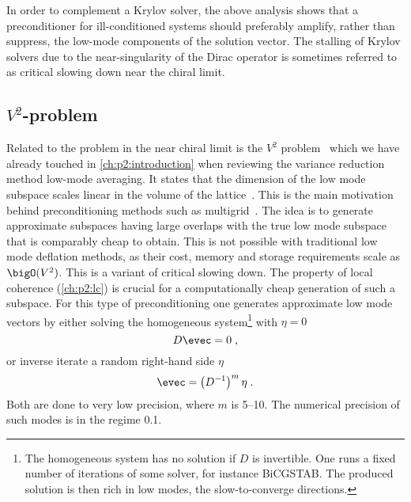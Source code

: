 
In order to complement a Krylov solver, the above analysis shows that a preconditioner for ill-conditioned systems should preferably amplify, rather than suppress, the low-mode components of the solution vector.
The stalling of Krylov solvers due to the near-singularity of the Dirac operator is sometimes referred to as critical slowing down near the chiral limit.

\subsection{\texorpdfstring{$V^{2}$}{V2}-problem}
\label{sec:mg:V2:problem}

Related to the problem in the near chiral limit is the $V^{2}$ problem~\cite{Luescher2007} which we have already touched in \cref{ch:p2:introduction} when reviewing the variance reduction method low-mode averaging.
It states that the dimension of the low mode subspace scales linear in the volume of the lattice~\cite{banks1980}.
This is the main motivation behind preconditioning methods such as multigrid~\cite{Babich:2010qb}.
The idea is to generate approximate subspaces having large overlaps with the true low mode subspace that is comparably cheap to obtain.
This is not possible with traditional low mode deflation methods, as their cost, memory and storage requirements scale as $\bigO(V^{2})$.
This is a variant of critical slowing down.
The property of local coherence (\cref{ch:p2:lc}) is crucial for a computationally cheap generation of such a subspace.
For this type of preconditioning one generates approximate low mode vectors by either solving the homogeneous system\footnote{The homogeneous system has no solution if $D$ is invertible. One runs a fixed number of iterations of some solver, for instance BiCGSTAB. The produced solution is then rich in low modes, \ie the slow-to-converge directions.} with $\eta=0$
\begin{equation}
D \evec = 0 \;,
\end{equation}{}
or inverse iterate a random right-hand side $\eta$
\begin{equation}
\evec = \left( D^{-1} \right)^{m} \eta \;.
\end{equation}
Both are done to very low precision, where $m$ is \numrange{5}{10}.
The numerical precision of such modes is in the regime \num{0.1}.

